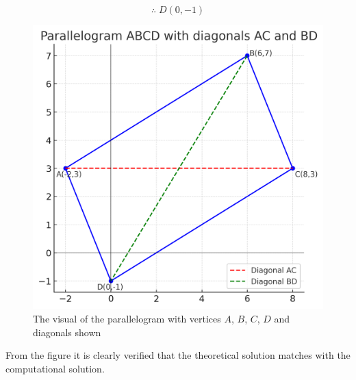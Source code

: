 \documentclass[journal]{IEEEtran}
\begin{document}
\[
\therefore \; D(0,-1)
\]

\begin{figure}[H]
    \centering
    \includegraphics[width=0.75\linewidth]{figs/fig1.png}
    \caption{The visual of the parallelogram with vertices $A$, $B$, $C$, $D$ and diagonals shown}
    \label{fig:figs/fig1.png}
\end{figure}


\noindent
From the figure it is clearly verified that the theoretical solution matches with the computational solution.
\end{document}
